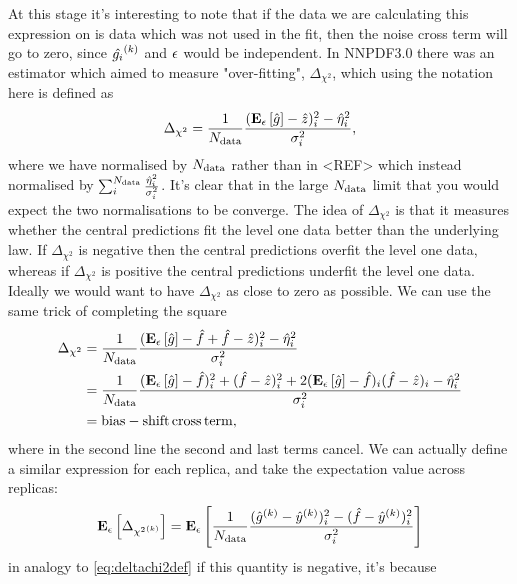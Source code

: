At this stage it's interesting to note that if the data we are calculating this
expression on is data which was not used in the fit, then the noise cross term
will go to zero, since $\hat{g_i}^{(k)}$ and $\epsilon$ would be
independent. In NNPDF3.0 there was an estimator which aimed to measure
"over-fitting", $\Delta_{\chi^2}$, which using the notation here is defined as
\begin{equation}
    \Delta_{\chi^2} = \frac{1}{N_{\rm data}}\frac{(\mathbf{E}_{\epsilon}\left[ \hat{g} \right] - \hat{z})_i^2 - \hat{\eta}_i^2}{\sigma^{2}_i},
\end{equation}
where we have normalised by $N_{\rm data}$ rather than in <REF> which instead normalised
by $\sum_i^{N_{\rm data}} \frac{\hat{\eta}_i^2}{\sigma^{2}_i}$. It's clear that in the large
$N_{\rm data}$ limit that you would expect the two normalisations to be converge. The
idea of $\Delta_{\chi^2}$ is that it measures whether the central predictions
fit the level one data better than the underlying law. If $\Delta_{\chi^2}$
is negative then the central predictions overfit the level one data, whereas
if $\Delta_{\chi^2}$ is positive the central predictions underfit the level one
data. Ideally we would want to have $\Delta_{\chi^2}$ as close to zero as possible.
We can use the same trick of completing the square
\begin{equation}\label{eq:deltachi2def}
    \begin{split}
        \Delta_{\chi^2} &= \frac{1}{N_{\rm data}}\frac{(\mathbf{E}_{\epsilon}\left[ \hat{g} \right] - \hat{f} + \hat{f} - \hat{z})_i^2 - \hat{\eta}_i^2}{\sigma^{2}_i} \\
        &= \frac{1}{N_{\rm data}}\frac{(\mathbf{E}_{\epsilon}\left[ \hat{g} \right] - \hat{f})_i^2 + (\hat{f} - \hat{z})_i^2 + 2(\mathbf{E}_{\epsilon}\left[ \hat{g} \right] - \hat{f})_i(\hat{f} - \hat{z})_i - \hat{\eta}_i^2}{\sigma^{2}_i} \\
        &= {\rm bias} - {\rm shift \, cross \, term},
    \end{split}
\end{equation}
where in the second line the second and last terms cancel. We can actually define
a similar expression for each replica, and take the expectation value across
replicas:
\begin{equation}\label{eq:erepdeltachi2def}
    \mathbf{E}_{\epsilon}\left[ \Delta_{{\chi^2}^{(k)}} \right] = \mathbf{E}_{\epsilon}\left[ \frac{1}{N_{\rm data}} \frac{(\hat{g}^{(k)} - \hat{y}^{(k)})_i^2 - (\hat{f} - \hat{y}^{(k)})_i^2}{\sigma^{2}_i} \right]
\end{equation}
in analogy to \eqref{eq:deltachi2def} if this quantity is negative, it's because
